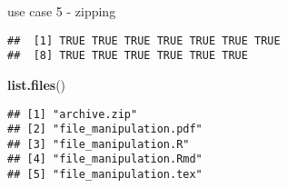\documentclass[ignorenonframetext,]{beamer}
\newenvironment{Shaded}{\begin{snugshade}}{\end{snugshade}}
\newcommand{\KeywordTok}[1]{\textcolor[rgb]{0.13,0.29,0.53}{\textbf{{#1}}}}
\newcommand{\DataTypeTok}[1]{\textcolor[rgb]{0.13,0.29,0.53}{{#1}}}
\newcommand{\StringTok}[1]{\textcolor[rgb]{0.31,0.60,0.02}{{#1}}}
\newcommand{\NormalTok}[1]{{#1}}
\begin{document}
\begin{frame}[fragile]{use case 5 - zipping}

\begin{Shaded}
\end{Shaded}

\begin{verbatim}
##  [1] TRUE TRUE TRUE TRUE TRUE TRUE TRUE
##  [8] TRUE TRUE TRUE TRUE TRUE TRUE
\end{verbatim}

\begin{Shaded}
\begin{Highlighting}[]
\KeywordTok{list.files}\NormalTok{()}
\end{Highlighting}
\end{Shaded}

\begin{verbatim}
## [1] "archive.zip"          
## [2] "file_manipulation.pdf"
## [3] "file_manipulation.R"  
## [4] "file_manipulation.Rmd"
## [5] "file_manipulation.tex"
\end{verbatim}

\end{frame}
\end{document}
